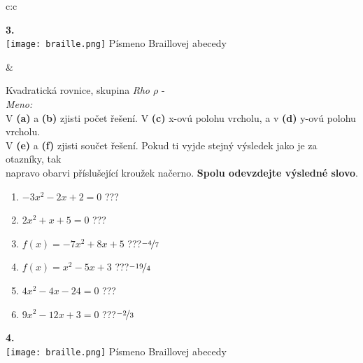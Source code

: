 \documentclass[10pt]{report}
\begin{document}
\begin{tabular}{c:c}
\begin{minipage}[c][99mm][t]{0.49\linewidth}
\begin{center}
\begin{minipage}{0.20\linewidth}
\begin{center}
{\Huge\bfseries 3.} \\[2mm]
\texttt{[image: braille.png]}
{\small Písmeno Braillovej abecedy}
\end{center}
\end{minipage}
\end{center}
\end{minipage}
&
\begin{minipage}[c][99mm][t]{0.49\linewidth}
\begin{center}
\vspace{7mm}
{\huge Kvadratická rovnice, skupina \textit{Rho $\rho$} -}\\[4.5mm]
\textit{Meno:}\phantom{xxxxxxxxxxxxxxxxxxxxxxxxxxxxxxxxxxxxxxxxxxxxxxxxxxxxxxxxxxxxxxxxx}\\[3.5mm]
V \textbf{(a)} a \textbf{(b)} zjisti počet řešení. V \textbf{(c)} x-ovú polohu vrcholu, a v \textbf{(d)} y-ovú polohu vrcholu.\\V \textbf{(e)} a \textbf{(f)} zjisti součet řešení. Pokud ti vyjde stejný výsledek jako je za otazníky, tak\\napravo obarvi příslušející kroužek načerno. \textbf{Spolu odevzdejte výsledné slovo}.\\[3mm]
\begin{minipage}{0.77\linewidth}
\begin{center}
\begin{varwidth}{\textwidth}
\begin{enumerate}
\large
\item $-3x^2-2x+2=0$\quad \dotfill\; ???\;\dotfill {}
\item $2x^2+x+5=0$\quad \dotfill\; ???\;\dotfill {}
\item $f(x)=-7x^2+8x+5$\quad \dotfill\; ???\;\dotfill \quad $\nicefrac{-4}{7}$
\item $f(x)=x^2-5x+3$\quad \dotfill\; ???\;\dotfill \quad $\nicefrac{-19}{4}$
\item $4x^2-4x-24=0$\quad \dotfill\; ???\;\dotfill {}
\item $9x^2-12x+3=0$\quad \dotfill\; ???\;\dotfill \quad $\nicefrac{-2}{3}$
\end{enumerate}
\end{varwidth}
\end{center}
\end{minipage}
\begin{minipage}{0.20\linewidth}
\begin{center}
{\Huge\bfseries 4.} \\[2mm]
\texttt{[image: braille.png]}
{\small Písmeno Braillovej abecedy}
\end{center}
\end{minipage}
\end{center}
\end{minipage}

\end{tabular}
\end{document}
